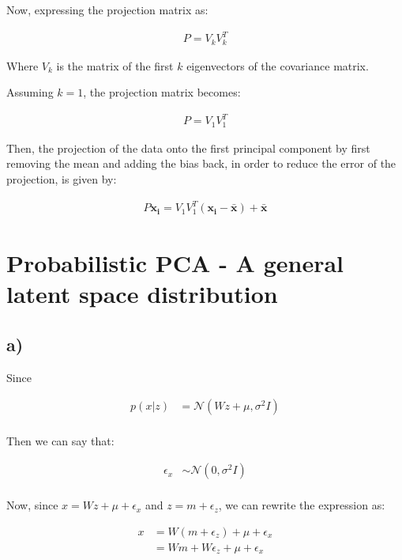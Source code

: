\documentclass[12pt,a4paper,oneside]{paper}
\begin{document}
Now, expressing the projection matrix as:

\begin{align*}
    P = V_k V_k^T
\end{align*}

Where \( V_k \) is the matrix of the first \( k \) eigenvectors of the covariance matrix.

Assuming $k = 1$, the projection matrix becomes:

\begin{align*}
    P = V_1 V_1^T
\end{align*}

Then, the projection of the data onto the first principal component by first removing the mean and adding the bias back, 
in order to reduce the error of the projection, is given by:

\begin{align*}
    P \bm{x_i} = V_1 V_1^T \left( \bm{x_i} - \bm{\bar{x}} \right) + \bm{\bar{x}}
\end{align*}

\newpage
\section{Probabilistic PCA - A general latent space distribution}

\subsection*{a)}

Since 

\begin{align*}
    p(x | z) &= \mathcal{N}(Wz + \mu, \sigma^2 I) \\
\end{align*}

Then we can say that:

\begin{align*}
    \epsilon_x &\sim \mathcal{N}(0, \sigma^2 I) \\
\end{align*}

Now, since \( x = Wz + \mu + \epsilon_x \) and $z = m + \epsilon_z$, we can rewrite the expression as:

\begin{align*}
    x &= W(m + \epsilon_z) + \mu + \epsilon_x \\
    &= Wm + W\epsilon_z + \mu + \epsilon_x \\
\end{align*}
\end{document}
